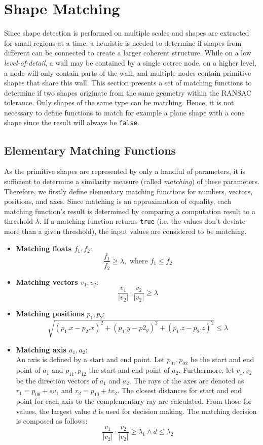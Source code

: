 \section{Shape Matching}
\label{sec:shapeMatching}

Since shape detection is performed on multiple scales and shapes are extracted for small regions at a time, a heuristic is needed to determine if shapes from different can be connected to create a larger coherent structure. While on a low \textit{level-of-detail}, a wall may be contained by a single octree node, on a higher level, a node will only contain parts of the wall, and multiple nodes contain primitive shapes that share this wall. This section presents a set of matching functions to determine if two shapes originate from the same geometry within the RANSAC tolerance. Only shapes of the same type can be matching. Hence, it is not necessary to define functions to match for example a plane shape with a cone shape since the result will always be \verb|false|. 


\subsection{Elementary Matching Functions}
\label{sec:elementarMatchingFuns}

As the primitive shapes are represented by only a handful of parameters, it is sufficient to determine a similarity measure (called \textit{matching}) of these parameters. Therefore, we firstly define elementary matching functions for numbers, vectors, positions, and axes. Since matching is an approximation of equality, each matching function's result is determined by comparing a computation result to a threshold $\lambda$. If a matching function returns \verb|true| (i.e. the values don't deviate more than a given threshold), the input values are considered to be matching. 

\begin{itemize}
    \item \textbf{Matching floats $f_1, f_2$}: 
        $$\frac{f_1}{f_2} \geq \lambda, \textrm{ where } f_1 \leq f_2$$  
    \item \textbf{Matching vectors $v_1, v_2$}: 
        $$\frac{v_1}{|v_2|} \cdot \frac{v_2}{|v_2|} \geq \lambda$$
    \item \textbf{Matching positions $p_1, p_2$}: 
        $$\sqrt{(p_1.x - p_2.x)^2 + (p_1.y - p2_y)^2 + (p_1.z - p_2.z)^2} \leq \lambda$$
    \item \textbf{Matching axis $a_1, a_2$}: 
    \\
    An axis is defined by a start and end point. Let $p_{01},p_{02}$ be the start and end point of $a_1$ and $p_{11}, p_{12}$ the start and end point of $a_2$. Furthermore, let $v_1, v_2$ be the direction vectors of $a_1$ and $a_2$. The rays of the axes are denoted as $r_1 = p_{00} + sv_1$ and $r_2 = p_{10} + tv_2$. The closest distances for start and end point for each axis to the complementary ray are calculated. From those for values, the largest value $d$ is used for decision making. The matching decision is composed as follows: 
        $$\frac{v_1}{|v_2|} \cdot \frac{v_2}{|v_2|} \geq \lambda_1 \land d \leq \lambda_2$$
\end{itemize}


